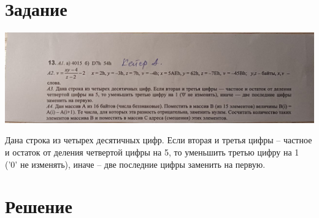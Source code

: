 \documentclass[12pt]{article}
\begin{document}
	
	\section*{Задание}
	
	\includegraphics[width=400pt]{variant_13.jpg}
	
	Дана строка из четырех десятичных цифр. Если вторая и третья цифры -- частное и остаток от деления четвертой цифры на 5, то уменьшить третью цифру на 1 ('0' не изменять), иначе -- две последние цифры заменить на первую.
	
	\newpage
	
	
	\section*{Решение}
	
\end{document}
